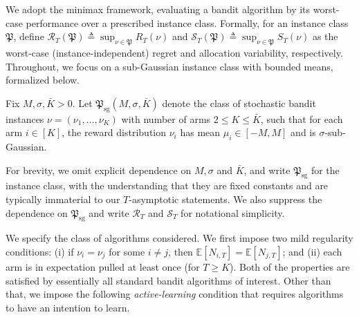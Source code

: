 \documentclass[nonblindrev]{informs3_noinforms}
\newcommand{\E}{{\mathbb{E}}}
\begin{document}
We adopt the minimax framework, evaluating a bandit algorithm by its worst-case performance over a prescribed instance class. Formally, for an instance class $\mathfrak{P}$, define $\mathcal{R}_T(\mathfrak{P})\triangleq \sup_{\nu\in\mathfrak{P}} R_T(\nu)$ and $\mathcal{S}_T(\mathfrak{P})\triangleq \sup_{\nu\in\mathfrak{P}} S_T(\nu)$ as the worst-case (instance-independent) regret and allocation variability, respectively. Throughout, we focus on a sub-Gaussian instance class with bounded means, formalized below.
\begin{definition}\label{def:instance-class}
Fix $M, \sigma, \bar{K} > 0$. Let $\mathfrak{P}_{\mathrm{sg}}(M,\sigma, \bar{K})$ denote the class of stochastic bandit instances
$\nu=(\nu_1,\dots,\nu_K)$ with number of arms $2 \le K \le \bar{K}$, such that for each arm $i\in[K]$, the reward distribution $\nu_i$ has mean $\mu_i\in[-M,M]$ and is $\sigma$-sub-Gaussian.
\end{definition}
For brevity, we omit explicit dependence on $M, \sigma$ and $\bar{K}$, and write $\mathfrak{P}_{\mathrm{sg}}$ for the instance class, with the understanding that they are fixed constants and are typically immaterial to our $T$-asymptotic statements. We also suppress the dependence on $\mathfrak{P}_{\mathrm{sg}}$ and write $\mathcal{R}_T$ and $\mathcal{S}_T$ for notational simplicity.



We specify the class of algorithms considered. We first impose two mild regularity conditions: (i) if $\nu_i=\nu_j$ for some $i\neq j$, then $\E[N_{i,T}] = \E[N_{j,T}]$; and (ii) each arm is in expectation pulled at least once (for $T\ge K$). Both of the properties are satisfied by essentially all standard bandit algorithms of interest. Other than that, we impose the following  \emph{active-learning} condition that requires algorithms to have an intention to learn.
\end{document}
